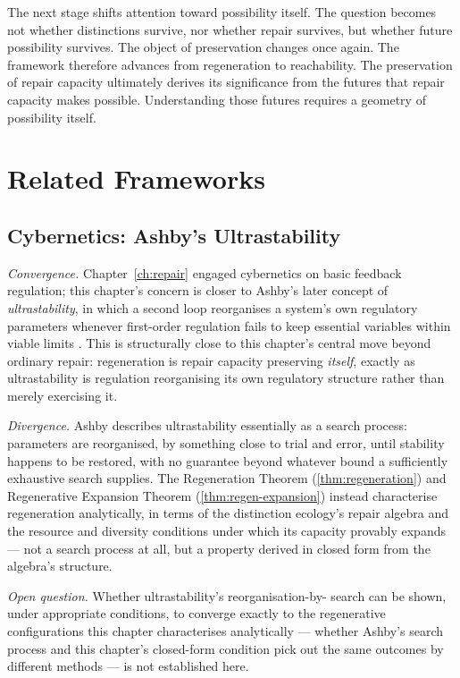 \documentclass[12pt,twoside,openright]{book}
\begin{document}
The next stage shifts attention toward possibility itself.
The question becomes not whether distinctions survive, nor
whether repair survives, but whether future possibility
survives. The object of preservation changes once again.
The framework therefore advances from regeneration to
reachability. The preservation of repair capacity
ultimately derives its significance from the futures that
repair capacity makes possible. Understanding those futures
requires a geometry of possibility itself.

\section{Related Frameworks}
\label{sec:ch11-related-frameworks}

\subsection*{Cybernetics: Ashby's Ultrastability}

\emph{Convergence.} Chapter~\ref{ch:repair} engaged cybernetics
on basic feedback regulation; this chapter's concern is closer
to Ashby's later concept of \emph{ultrastability}, in which a
second loop reorganises a system's own regulatory parameters
whenever first-order regulation fails to keep essential
variables within viable limits \parencite{ashby1956}. This is
structurally close to this chapter's central move beyond
ordinary repair: regeneration is repair capacity preserving
\emph{itself}, exactly as ultrastability is regulation
reorganising its own regulatory structure rather than merely
exercising it.

\emph{Divergence.} Ashby describes ultrastability essentially as
a search process: parameters are reorganised, by something close
to trial and error, until stability happens to be restored, with
no guarantee beyond whatever bound a sufficiently exhaustive
search supplies. The Regeneration Theorem
(\cref{thm:regeneration}) and Regenerative Expansion Theorem
(\cref{thm:regen-expansion}) instead characterise regeneration
analytically, in terms of the distinction ecology's repair
algebra and the resource and diversity conditions under which
its capacity provably expands --- not a search process at all,
but a property derived in closed form from the algebra's
structure.

\emph{Open question.} Whether ultrastability's reorganisation-by-
search can be shown, under appropriate conditions, to converge
exactly to the regenerative configurations this chapter
characterises analytically --- whether Ashby's search process
and this chapter's closed-form condition pick out the same
outcomes by different methods --- is not established here.
\end{document}
